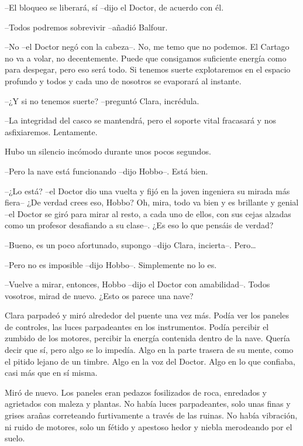 {--El bloqueo se liberará, sí --dijo el Doctor, de acuerdo con él.}

{--Todos podremos sobrevivir --añadió Balfour.}

{--No --el Doctor negó con la cabeza--. No, me temo que no podemos. El
 Cartago no va a volar, no decentemente. Puede que consigamos suficiente
 energía como para despegar, pero eso será todo. Si tenemos suerte
 explotaremos en el espacio profundo y todos y cada uno de nosotros se
evaporará al instante.}

{--¿Y si no tenemos suerte? --preguntó Clara, incrédula.}

{--La integridad del casco se mantendrá, pero el soporte vital fracasará
y nos asfixiaremos. Lentamente.}

{Hubo un silencio incómodo durante unos pocos segundos.}

{--Pero la nave está funcionando --dijo Hobbo--. Está bien.}

{--¿Lo está? --el Doctor dio una vuelta y fijó en la joven ingeniera su
 mirada más fiera-- ¿De verdad crees eso, Hobbo? Oh, mira, todo va bien y
 es brillante y genial --el Doctor se giró para mirar al resto, a cada
 uno de ellos, con sus cejas alzadas como un profesor desafiando a su
clase--. ¿Es eso lo que pensáis de verdad?}

{--Bueno, es un poco afortunado, supongo --dijo Clara, incierta--.
 Pero\ldots{}}

{--Pero no es imposible --dijo Hobbo--. Simplemente no lo es.}

{--Vuelve a mirar, entonces, Hobbo --dijo el Doctor con amabilidad--.
Todos vosotros, mirad de nuevo. ¿Esto os parece una nave?}

{Clara parpadeó y miró alrededor del puente una vez más. Podía ver los
 paneles de controles, las luces parpadeantes en los instrumentos. Podía
 percibir el zumbido de los motores, percibir la energía contenida dentro
 de la nave. Quería decir que sí, pero algo se lo impedía. Algo en la
 parte trasera de su mente, como el pitido lejano de un timbre. Algo en
la voz del Doctor. Algo en lo que confiaba, casi más que en sí misma.}

{Miró de nuevo. Los paneles eran pedazos fosilizados de roca, enredados y
 agrietados con maleza y plantas. No había luces parpadeantes, solo unas
 finas y grises arañas correteando furtivamente a través de las ruinas.
 No había vibración, ni ruido de motores, solo un fétido y apestoso hedor
y niebla merodeando por el suelo.}

